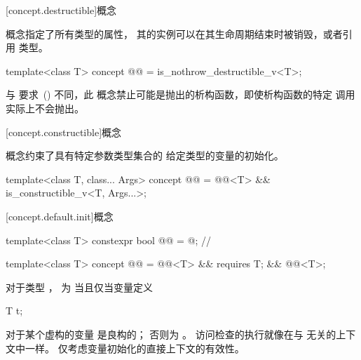 [concept.destructible]{概念 }

\pnum
{} 概念指定了所有类型的属性，
其的实例可以在其生命周期结束时被销毁，或者引用
类型。

\begin{itemdecl}
template<class T>
concept @@ = is_nothrow_destructible_v<T>;
\end{itemdecl}

\begin{itemdescr}
\pnum
\begin{note}
与  要求~() 不同，此
概念禁止可能是抛出的析构函数，即使析构函数的特定
调用实际上不会抛出。
\end{note}
\end{itemdescr}

[concept.constructible]{概念 }

\pnum
{} 概念约束了具有特定参数类型集合的
给定类型的变量的初始化。

\begin{itemdecl}
template<class T, class... Args>
concept @@ = @@<T> && is_constructible_v<T, Args...>;
\end{itemdecl}

[concept.default.init]{概念 }

\begin{itemdecl}
template<class T>
constexpr bool @@ = @\seebelow@;         // \expos

template<class T>
concept @@ = @@<T> &&
                                requires { T{}; } &&
                                @@<T>;
\end{itemdecl}

\begin{itemdescr}
\pnum
对于类型 ， 为 
当且仅当变量定义
\begin{codeblock}
T t;
\end{codeblock}
对于某个虚构的变量  是良构的；
否则为 。
访问检查的执行就像在与  无关的上下文中一样。
仅考虑变量初始化的直接上下文的有效性。
\end{itemdescr}

